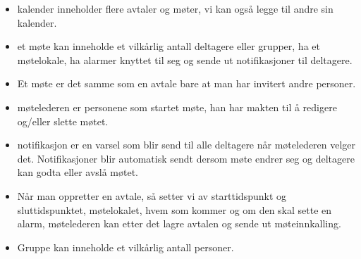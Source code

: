 \begin{itemize}
  \item kalender inneholder flere avtaler og møter, vi kan også legge til andre sin kalender.
  \item  et møte kan inneholde et vilkårlig antall deltagere eller grupper, ha et møtelokale, ha alarmer knyttet til seg og sende ut notifikasjoner til deltagere.
  \item Et møte er det samme som en avtale bare at man har invitert andre personer.
  \item  møtelederen er personene som startet møte, han har makten til å redigere og/eller slette møtet.
  \item notifikasjon er en varsel som blir send til alle deltagere når møtelederen velger det. Notifikasjoner blir automatisk sendt dersom møte endrer seg og deltagere kan godta eller avslå møtet.
  \item  Når man oppretter en avtale, så setter vi av starttidspunkt og sluttidspunktet, møtelokalet, hvem som kommer og om den skal sette en alarm, møtelederen kan etter det lagre avtalen og sende ut møteinnkalling.
  \item Gruppe kan inneholde et vilkårlig antall personer.
\end{itemize}